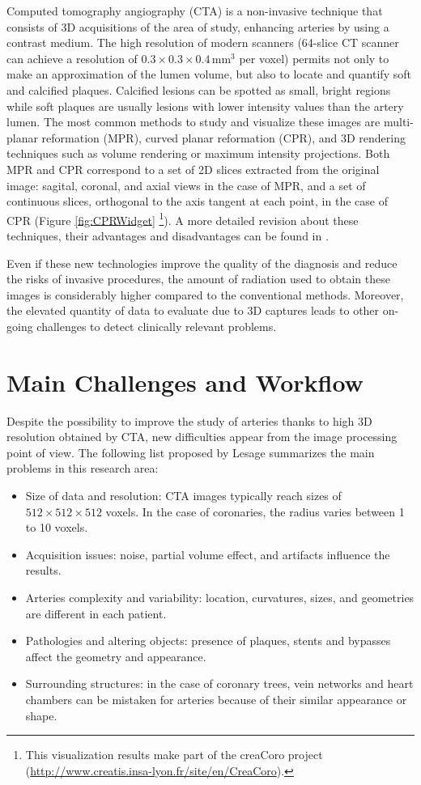 Computed tomography angiography (CTA) is a non-invasive technique that consists of 3D acquisitions of the area of study, enhancing arteries by using a contrast medium. The high resolution of modern scanners (64-slice CT scanner can achieve a resolution of $0.3 \times 0.3 \times 0.4${\,}mm$^3$ per voxel) permits not only to make an approximation of the lumen volume, but also to locate and quantify soft and calcified plaques. Calcified lesions can be spotted as small, bright regions while soft plaques are usually lesions with lower intensity values than the artery lumen. The most common methods to study and visualize these images are multi-planar reformation (MPR), curved planar reformation (CPR), and 3D rendering techniques such as volume rendering or maximum intensity projections. Both MPR and CPR correspond to a set of 2D slices extracted from the original image: sagital, coronal, and axial views in the case of MPR, and a set of continuous slices, orthogonal to the axis tangent at each point, in the case of CPR (Figure \ref{fig:CPRWidget} \footnote{This visualization results make part of the creaCoro project (\href{http://www.creatis.insa-lyon.fr/site/en/CreaCoro}{http://www.creatis.insa-lyon.fr/site/en/CreaCoro}).}). A more detailed revision about these techniques, their advantages and disadvantages can be found in \citep{Wang2011Thesis}.

Even if these new technologies improve the quality of the diagnosis and reduce the risks of invasive procedures, the amount of radiation used to obtain these images is considerably higher compared to the conventional methods. Moreover, the elevated quantity of data to evaluate due to 3D captures leads to other on-going challenges to detect clinically relevant problems.

\section{Main Challenges and Workflow}
%
Despite the possibility to improve the study of arteries thanks to high 3D resolution obtained by CTA, new difficulties appear from the image processing point of view. The following list proposed by Lesage \citep{Lesage2009Thesis} summarizes the main problems in this research area:

\begin{itemize}
	\item Size of data and resolution: CTA images typically reach sizes of $512\times512\times512$ voxels. In the case of coronaries, the radius varies between 1 to 10 voxels.	
	\item Acquisition issues: noise, partial volume effect, and artifacts influence the results.	
	\item Arteries complexity and variability: location, curvatures, sizes, and geometries are different in each patient.
	\item Pathologies and altering objects: presence of plaques, stents and bypasses affect the geometry and appearance.
	\item Surrounding structures: in the case of coronary trees, vein networks and heart chambers can be mistaken for arteries because of their similar appearance or shape. 
\end{itemize}

